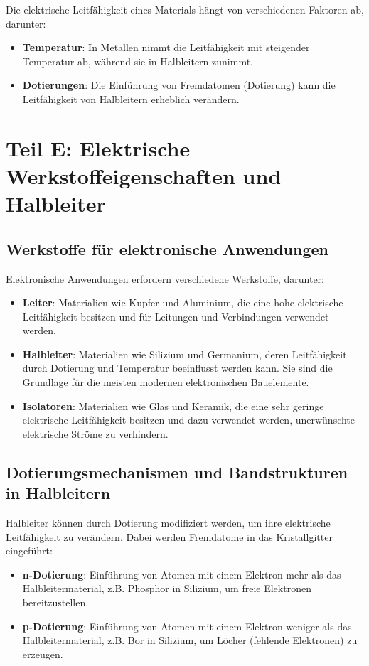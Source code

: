 \documentclass[a4paper,12pt]{article}
\begin{document}
Die elektrische Leitfähigkeit eines Materials hängt von verschiedenen Faktoren ab, darunter:
\begin{itemize}
    \item \textbf{Temperatur}: In Metallen nimmt die Leitfähigkeit mit steigender Temperatur ab, während sie in Halbleitern zunimmt.
    \item \textbf{Dotierungen}: Die Einführung von Fremdatomen (Dotierung) kann die Leitfähigkeit von Halbleitern erheblich verändern.
\end{itemize}

\newpage


\section{Teil E: Elektrische Werkstoffeigenschaften und Halbleiter}

\subsection{Werkstoffe für elektronische Anwendungen}

Elektronische Anwendungen erfordern verschiedene Werkstoffe, darunter:
\begin{itemize}
    \item \textbf{Leiter}: Materialien wie Kupfer und Aluminium, die eine hohe elektrische Leitfähigkeit besitzen und für Leitungen und Verbindungen verwendet werden.
    \item \textbf{Halbleiter}: Materialien wie Silizium und Germanium, deren Leitfähigkeit durch Dotierung und Temperatur beeinflusst werden kann. Sie sind die Grundlage für die meisten modernen elektronischen Bauelemente.
    \item \textbf{Isolatoren}: Materialien wie Glas und Keramik, die eine sehr geringe elektrische Leitfähigkeit besitzen und dazu verwendet werden, unerwünschte elektrische Ströme zu verhindern.
\end{itemize}

\subsection{Dotierungsmechanismen und Bandstrukturen in Halbleitern}

Halbleiter können durch Dotierung modifiziert werden, um ihre elektrische Leitfähigkeit zu verändern. Dabei werden Fremdatome in das Kristallgitter eingeführt:

\begin{itemize}
    \item \textbf{n-Dotierung}: Einführung von Atomen mit einem Elektron mehr als das Halbleitermaterial, z.B. Phosphor in Silizium, um freie Elektronen bereitzustellen.
    \item \textbf{p-Dotierung}: Einführung von Atomen mit einem Elektron weniger als das Halbleitermaterial, z.B. Bor in Silizium, um Löcher (fehlende Elektronen) zu erzeugen.
\end{itemize}
\end{document}

